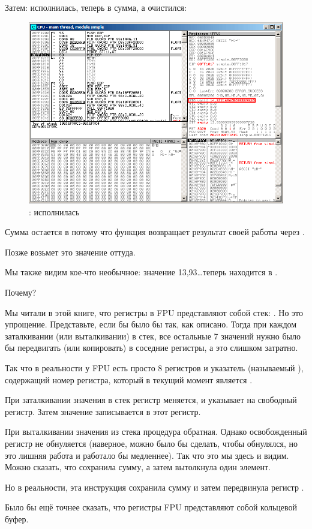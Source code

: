 \clearpage
Затем: \FADDP исполнилась, теперь в  сумма, а  очистился:

\begin{figure}[H]
\centering
\includegraphics[scale=\FigScale]{patterns/12_FPU/1_simple/olly5.png}
\caption{\olly: \FADDP исполнилась}
\label{fig:FPU_simple_olly_5}
\end{figure}

Сумма остается в  потому что функция возвращает результат своей работы через .

Позже \main возьмет это значение оттуда.

Мы также видим кое-что необычное: значение 13,93\ldots теперь находится в .

Почему?

\label{FPU_is_rather_circular_buffer}
Мы читали в этой книге, что регистры в \ac{FPU} представляют собой стек: . 
Но это упрощение.
Представьте, если бы  было бы так, как описано. Тогда при каждом заталкивании (или выталкивании) в стек,
все остальные 7 значений нужно было бы передвигать (или копировать) в соседние регистры, 
а это слишком затратно.

Так что в реальности у
\ac{FPU} есть просто 8 регистров и указатель (называемый ), содержащий номер регистра,
который в текущий момент является .

При заталкивании значения в стек регистр  меняется, и указывает на свободный регистр. 
Затем значение записывается в этот регистр.

При выталкивании значения из стека процедура обратная. Однако освобожденный регистр не обнуляется
(наверное, можно было бы сделать, чтобы обнулялся, но это лишняя работа и работало бы медленнее).
Так что это мы здесь и видим. 
Можно сказать, что \FADDP сохранила сумму, а затем вытолкнула один элемент.

Но в реальности, эта инструкция сохранила сумму и затем передвинула регистр .

Было бы ещё точнее сказать, что регистры \ac{FPU} представляют собой кольцевой буфер.

